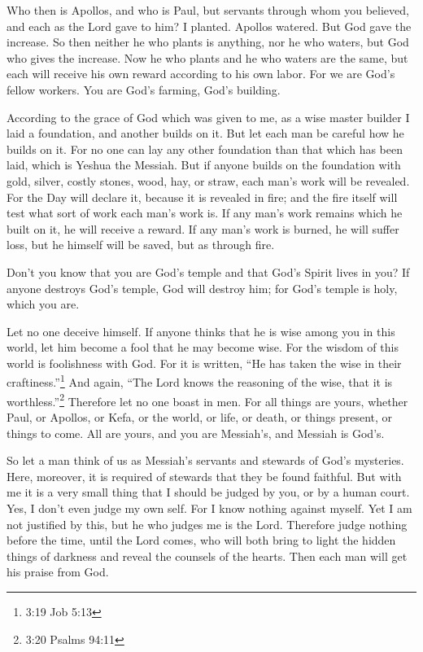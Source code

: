 \myverse{}Who then is Apollos, and who is Paul, but servants through whom
you believed, and each as the Lord gave to him?
\myverse{}I planted. Apollos watered. But God gave the increase.
\myverse{}So then neither he who plants is anything, nor he who waters, but God who gives
the increase.
\myverse{}Now he who plants and he who waters are the same, but each will receive his
own reward according to his own labor.
\myverse{}For we are God’s fellow workers. You are God’s farming, God’s building.

\myverse{}According to the grace of God which was given to me, as a wise
master builder I laid a foundation, and another builds on it. But let each man be careful how he builds
on it.
\myverse{}For no one can lay any other foundation than that which has been laid, which
is Yeshua the Messiah.
\myverse{}But if anyone builds on the foundation with gold, silver, costly stones, wood,
hay, or straw,
\myverse{}each man’s work will be revealed. For the Day will declare it, because it
is revealed in fire; and the fire itself will test what sort of work each man’s work is.
\myverse{}If any man’s work remains which he built on it, he will receive a reward.
\myverse{}If any man’s work is burned, he will suffer loss, but he himself will be saved,
but as through fire.

\myverse{}Don’t you know that you are God’s temple and that God’s Spirit
lives in you?
\myverse{}If anyone destroys God’s temple, God will destroy him; for God’s temple is
holy, which you are.

\myverse{}Let no one deceive himself. If anyone thinks that he is wise
among you in this world, let him become a fool that he may become wise.
\myverse{}For the wisdom of this world is foolishness with God. For it is written, “He
has taken the wise in their craftiness.”\footnote{3:19 Job 5:13}
\myverse{}And again, “The Lord knows the reasoning of the wise, that it is worthless.”\footnote{3:20 Psalms 94:11}
\myverse{}Therefore let no one boast in men. For all things are yours,
\myverse{}whether Paul, or Apollos, or Kefa, or the world, or life, or death, or things
present, or things to come. All are yours,
\myverse{}and you are Messiah’s, and Messiah is God’s.


\mychapter{} \myverse*{}So let a man think of us as Messiah’s servants and stewards of
God’s mysteries.
\myverse{}Here, moreover, it is required of stewards that they be found faithful.
\myverse{}But with me it is a very small thing that I should be judged by you, or by a
human court. Yes, I don’t even judge my own self.
\myverse{}For I know nothing against myself. Yet I am not justified by this, but he who
judges me is the Lord.
\myverse{}Therefore judge nothing before the time, until the Lord comes, who will both
bring to light the hidden things of darkness and reveal the counsels of the hearts. Then each man will
get his praise from God.


